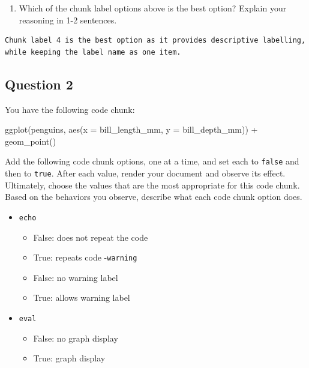 \documentclass[
  letterpaper,
  DIV=11,
  numbers=noendperiod]{scrartcl}
\newenvironment{Shaded}{\begin{snugshade}}{\end{snugshade}}
\newcommand{\AttributeTok}[1]{\textcolor[rgb]{0.40,0.45,0.13}{#1}}
\newcommand{\FunctionTok}[1]{\textcolor[rgb]{0.28,0.35,0.67}{#1}}
\newcommand{\NormalTok}[1]{\textcolor[rgb]{0.00,0.23,0.31}{#1}}
\newcommand{\SpecialCharTok}[1]{\textcolor[rgb]{0.37,0.37,0.37}{#1}}
\providecommand{\tightlist}{%
  \setlength{\itemsep}{0pt}\setlength{\parskip}{0pt}}
\begin{document}
\begin{enumerate}
\begin{tcolorbox}
  Try each label option in the code chunk provided in your document. If
  it gives you an error (document doesn't render), you know it's not a
  proper chunk label.

  \end{tcolorbox}
\item
  Which of the chunk label options above is the best option? Explain
  your reasoning in 1-2 sentences.
\end{enumerate}

\begin{verbatim}
Chunk label 4 is the best option as it provides descriptive labelling, while keeping the label name as one item.
\end{verbatim}

\subsection{Question 2}\label{question-2}

You have the following code chunk:

\begin{Shaded}
\begin{Highlighting}[]
\FunctionTok{ggplot}\NormalTok{(penguins, }\FunctionTok{aes}\NormalTok{(}\AttributeTok{x =}\NormalTok{ bill\_length\_mm, }\AttributeTok{y =}\NormalTok{ bill\_depth\_mm)) }\SpecialCharTok{+} 
  \FunctionTok{geom\_point}\NormalTok{()}
\end{Highlighting}
\end{Shaded}

Add the following code chunk options, one at a time, and set each to
\texttt{false} and then to \texttt{true}. After each value, render your
document and observe its effect. Ultimately, choose the values that are
the most appropriate for this code chunk. Based on the behaviors you
observe, describe what each code chunk option does.

\begin{itemize}
\tightlist
\item
  \texttt{echo}

  \begin{itemize}
  \tightlist
  \item
    False: does not repeat the code
  \item
    True: repeats code -\texttt{warning}
  \item
    False: no warning label
  \item
    True: allows warning label
  \end{itemize}
\item
  \texttt{eval}

  \begin{itemize}
  \tightlist
  \item
    False: no graph display
  \item
    True: graph display
  \end{itemize}
\end{itemize}
\end{document}
